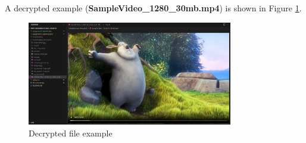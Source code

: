 \documentclass[11pt]{article}
\begin{document}
A decrypted example (\textbf{SampleVideo\_1280\_30mb.mp4}) is shown in Figure \ref{fig:decrypted_exapmle}.
\begin{figure}[htbp]
    \centering
    \includegraphics[width=0.8\textwidth]{img/decrypted_exapmle.png}
    \caption{Decrypted file example}
    \label{fig:decrypted_exapmle}
\end{figure}
\end{document}
